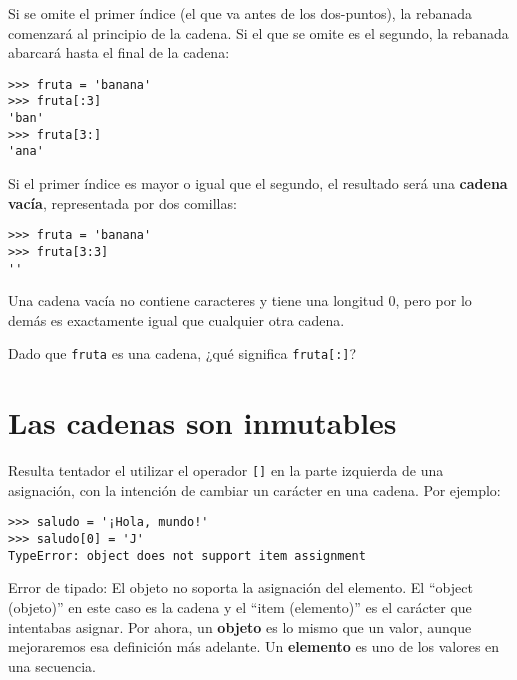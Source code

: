 Si se omite el primer índice (el que va antes de los dos-puntos), la rebanada comenzará
al principio de la cadena. Si el que se omite es el segundo, la rebanada
abarcará hasta el final de la cadena: 

\beforeverb
\begin{verbatim}
>>> fruta = 'banana'
>>> fruta[:3]
'ban'
>>> fruta[3:]
'ana'
\end{verbatim}
\afterverb
%
Si el primer índice es mayor o igual que el segundo, el resultado será
una {\bf cadena vacía}, representada por dos comillas:


\beforeverb
\begin{verbatim}
>>> fruta = 'banana'
>>> fruta[3:3]
''
\end{verbatim}
\afterverb
%
Una cadena vacía no contiene caracteres y tiene una longitud 0, pero por
lo demás es exactamente igual que cualquier otra cadena.

\begin{ex}
Dado que {\tt fruta} es una cadena, ¿qué significa
{\tt fruta[:]}?



\end{ex}


\section{Las cadenas son inmutables}

Resulta tentador el utilizar el operador {\tt []} en la parte izquierda de una
asignación, con la intención de cambiar un carácter en una cadena.
Por ejemplo:


\beforeverb
\begin{verbatim}
>>> saludo = '¡Hola, mundo!'
>>> saludo[0] = 'J'
TypeError: object does not support item assignment
\end{verbatim}
\afterverb
%
Error de tipado: El objeto no soporta la asignación del elemento.
El ``object (objeto)'' en este caso es la cadena y el ``item (elemento)'' es
el carácter que intentabas asignar. Por ahora, un {\bf objeto} es
lo mismo que un valor, aunque mejoraremos esa definición más adelante.
Un {\bf elemento} es uno de los valores en una secuencia.


